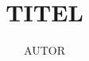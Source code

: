 \documentclass[titel2]{myNakLatex}
\author{AUTOR}
\title{TITEL}
\begin{document}
	
	\begin{frontmatter}
			\maketitle
			\inhaltsverzeichnis{}
			\abbildungsverzeichnis{}
			\tabellenverzeichnis{}
	\end{frontmatter}
	
	\begin{mainmatter}
		
		
	\end{mainmatter}
	
	\begin{backmatter}
		\quellenverzeichnis{}
	\end{backmatter}
\end{document}
